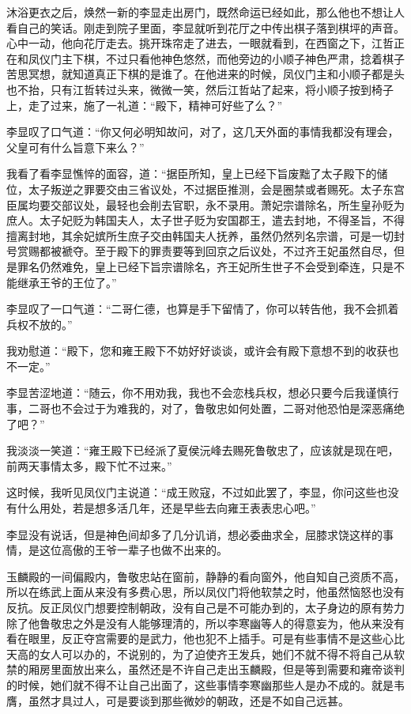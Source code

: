 沐浴更衣之后，焕然一新的李显走出房门，既然命运已经如此，那么他也不想让人看自己的笑话。刚走到院子里面，李显就听到花厅之中传出棋子落到棋坪的声音。心中一动，他向花厅走去。挑开珠帘走了进去，一眼就看到，在西窗之下，江哲正在和凤仪门主下棋，不过只看他神色悠然，而他旁边的小顺子神色严肃，捻着棋子苦思冥想，就知道真正下棋的是谁了。在他进来的时候，凤仪门主和小顺子都是头也不抬，只有江哲转过头来，微微一笑，然后江哲站了起来，将小顺子按到椅子上，走了过来，施了一礼道：“殿下，精神可好些了么？”

李显叹了口气道：“你又何必明知故问，对了，这几天外面的事情我都没有理会，父皇可有什么旨意下来么？”

我看了看李显憔悴的面容，道：“据臣所知，皇上已经下旨废黜了太子殿下的储位，太子叛逆之罪要交由三省议处，不过据臣推测，会是圈禁或者赐死。太子东宫臣属均要交部议处，最轻也会削去官职，永不录用。萧妃宗谱除名，所生皇孙贬为庶人。太子妃贬为韩国夫人，太子世子贬为安国郡王，遣去封地，不得圣旨，不得擅离封地，其余妃嫔所生庶子交由韩国夫人抚养，虽然仍然列名宗谱，可是一切封号赏赐都被褫夺。至于殿下的罪责要等到回京之后议处，不过齐王妃虽然自尽，但是罪名仍然难免，皇上已经下旨宗谱除名，齐王妃所生世子不会受到牵连，只是不能继承王爷的王位了。”

李显叹了一口气道：“二哥仁德，也算是手下留情了，你可以转告他，我不会抓着兵权不放的。”

我劝慰道：“殿下，您和雍王殿下不妨好好谈谈，或许会有殿下意想不到的收获也不一定。”

李显苦涩地道：“随云，你不用劝我，我也不会恋栈兵权，想必只要今后我谨慎行事，二哥也不会过于为难我的，对了，鲁敬忠如何处置，二哥对他恐怕是深恶痛绝了吧？”

我淡淡一笑道：“雍王殿下已经派了夏侯沅峰去赐死鲁敬忠了，应该就是现在吧，前两天事情太多，殿下忙不过来。”

这时候，我听见凤仪门主说道：“成王败寇，不过如此罢了，李显，你问这些也没有什么用处，若是想多活几年，还是早些去向雍王表表忠心吧。”

李显没有说话，但是神色间却多了几分讥诮，想必委曲求全，屈膝求饶这样的事情，是这位高傲的王爷一辈子也做不出来的。

玉麟殿的一间偏殿内，鲁敬忠站在窗前，静静的看向窗外，他自知自己资质不高，所以在练武上面从来没有多费心思，所以凤仪门将他软禁之时，他虽然恼怒也没有反抗。反正凤仪门想要控制朝政，没有自己是不可能办到的，太子身边的原有势力除了他鲁敬忠之外是没有人能够理清的，所以李寒幽等人的得意妄为，他从来没有看在眼里，反正夺宫需要的是武力，他也犯不上插手。可是有些事情不是这些心比天高的女人可以办的，不说别的，为了迫使齐王发兵，她们不就不得不将自己从软禁的厢房里面放出来么，虽然还是不许自己走出玉麟殿，但是等到需要和雍帝谈判的时候，她们就不得不让自己出面了，这些事情李寒幽那些人是办不成的。就是韦膺，虽然才具过人，可是要谈到那些微妙的朝政，还是不如自己远甚。

